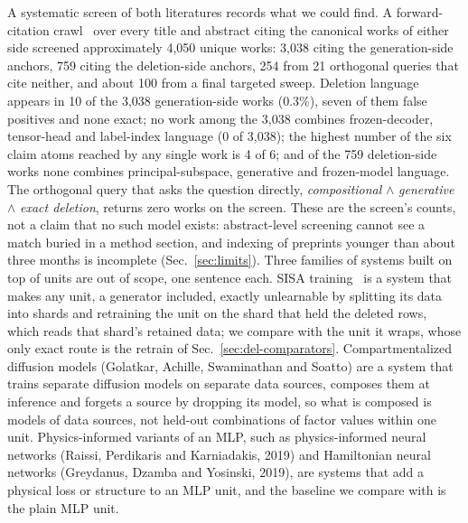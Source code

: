 \documentclass{article} %
\begin{document}
A systematic screen of both literatures records what we could find. A forward-citation
crawl~\citep{priem2022openalex} over every title and abstract citing the canonical works of either side screened
approximately 4,050 unique works: 3,038 citing the generation-side anchors, 759 citing the
deletion-side anchors, 254 from 21 orthogonal queries that cite neither, and about 100 from
a final targeted sweep. %
Deletion language appears in 10 of the 3,038 generation-side works (0.3\%), seven of them
false positives and none exact; no work among the 3,038 combines frozen-decoder,
tensor-head and label-index language (0 of 3,038); the highest number of the six claim
atoms reached by any single work is 4 of 6; and of the 759 deletion-side works none combines
principal-subspace, generative and frozen-model language. %
The orthogonal query that asks the question directly, \emph{compositional} $\wedge$
\emph{generative} $\wedge$ \emph{exact deletion}, returns zero works on the screen.
These are the screen's counts, not a claim that no such model exists: abstract-level screening
cannot see a match buried in a method section, and indexing of preprints younger than about
three months is incomplete (Sec.~\ref{sec:limits}).
Three families of systems built on top of units are out of scope, one sentence each.
SISA training~\citep{bourtoule2021machine} is a system that makes any unit, a generator included,
exactly unlearnable by splitting its data into shards and retraining the unit on the shard that
held the deleted rows, which reads that shard's retained data; we compare with the unit it wraps,
whose only exact route is the retrain of Sec.~\ref{sec:del-comparators}.
Compartmentalized diffusion models (Golatkar, Achille, Swaminathan and Soatto\nocite{golatkar2023training}) are a system that
trains separate diffusion models on separate data sources, composes them at inference and forgets
a source by dropping its model, so what is composed is models of data sources, not held-out
combinations of factor values within one unit.
Physics-informed variants of an MLP, such as physics-informed neural networks (Raissi, Perdikaris
and Karniadakis, 2019\nocite{raissi2019physics}) and Hamiltonian neural networks (Greydanus, Dzamba and Yosinski, 2019\nocite{greydanus2019hamiltonian}), are
systems that add a physical loss or structure to an MLP unit, and the baseline we compare with is the
plain MLP unit.
\end{document}
